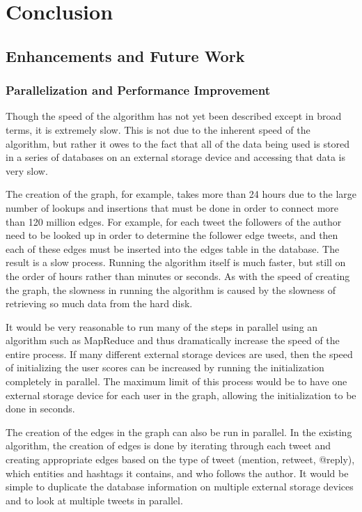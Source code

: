 \chapter{Conclusion}


\section{Enhancements and Future Work}

\subsection{Parallelization and Performance Improvement}


Though the speed of the algorithm has not yet been described except in broad terms, it is extremely slow. This is not due to the inherent speed of the algorithm, but rather it owes to the fact that all of the data being used is stored in a series of databases on an external storage device and accessing that data is very slow.

The creation of the graph, for example, takes more than 24 hours due to the large number of lookups and insertions that must be done in order to connect more than 120 million edges. For example, for each tweet the followers of the author need to be looked up in order to determine the follower edge tweets, and then each of these edges must be inserted into the edges table in the database. The result is a slow process. Running the algorithm itself is much faster, but still on the order of hours rather than minutes or seconds. As with the speed of creating the graph, the slowness in running the algorithm is caused by the slowness of retrieving so much data from the hard disk.

It would be very reasonable to run many of the steps in parallel using an algorithm such as MapReduce and thus dramatically increase the speed of the entire process. If many different external storage devices are used, then the speed of initializing the user scores can be increased by running the initialization completely in parallel. The maximum limit of this process would be to have one external storage device for each user in the graph, allowing the initialization to be done in seconds.

The creation of the edges in the graph can also be run in parallel. In the existing algorithm, the creation of edges is done by iterating through each tweet and creating appropriate edges based on the type of tweet (mention, retweet, @reply), which entities and hashtags it contains, and who follows the author. It would be simple to duplicate the database information on multiple external storage devices and to look at multiple tweets in parallel.

